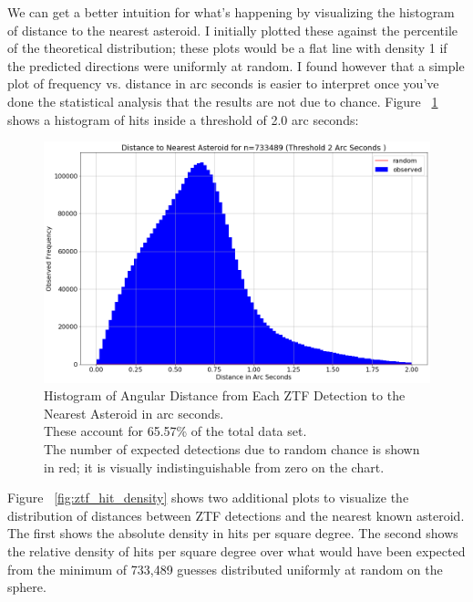 We can get a better intuition for what's happening by visualizing the histogram of distance to the nearest asteroid.
I initially plotted these against the percentile of the theoretical distribution; 
these plots would be a flat line with density 1 if the predicted directions were uniformly at random.
I found however that a simple plot of frequency vs. distance in arc seconds is easier to interpret 
once you've done the statistical analysis that the results are not due to chance.
Figure ~\ref{fig:hist_ztf_near_ast_dist} shows a histogram of hits inside a threshold of 2.0 arc seconds:
\begin{figure}[hbt!]
\begin{center}
\includegraphics[width=1.0\textwidth]{../figs/ztf/nearest_ast_hist_dist.png}
\end{center}
\caption[Histogram of Angular Distance from ZTF Detections to the Nearest Asteroid]
{Histogram of Angular Distance from Each ZTF Detection to the Nearest Asteroid in arc seconds.\\
These account for 65.57\% of the total data set.\\
The number of expected detections due to random chance is shown in red; it is visually indistinguishable from zero on the chart.}
\label{fig:hist_ztf_near_ast_dist}
\end{figure}
Figure ~\ref{fig:ztf_hit_density} shows two additional plots to visualize the distribution of distances between ZTF detections and the nearest known asteroid.
The first shows the absolute density in hits per square degree.
The second shows the relative density of hits per square degree over what would have been expected
from the minimum of 733,489 guesses distributed uniformly at random on the sphere. \\
